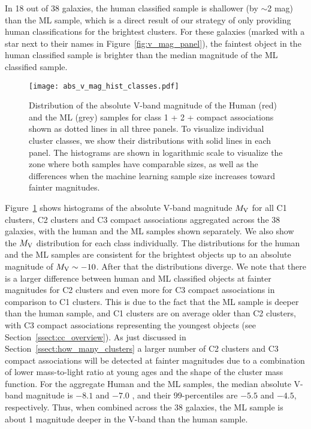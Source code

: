 \documentclass[linenumbers]{aastex63}
\begin{document}
In 18 out of 38 galaxies, the human classified sample is shallower (by $\sim$2 mag) than the ML sample, which is a direct result of our strategy of only providing human classifications for the brightest clusters. %
For these galaxies (marked with a star next to their names in Figure~\ref{fig:v_mag_panel}), the faintest object in the human classified sample is brighter than the median magnitude of the ML classified sample. 
%
\begin{figure} 
\texttt{[image: abs\_v\_mag\_hist\_classes.pdf]}
 \caption{Distribution of the absolute V-band magnitude of the Human (red) and the ML (grey) samples for class 1 + 2 + compact associations shown as dotted lines in all three panels. To visualize individual cluster classes, we show their distributions with solid lines in each panel. The histograms are shown in logarithmic scale to visualize the zone where both samples have comparable sizes, as well as the differences when the machine learning sample size increases toward fainter magnitudes. }%
 \label{fig:v_abs_mag}
\end{figure}
%

Figure~\ref{fig:v_abs_mag} shows histograms of the absolute V-band magnitude $M_{\rm V}$ for all C1 clusters, C2 clusters and C3 compact associations aggregated across the 38 galaxies, with the human and the ML samples shown separately. We also show the $M_{\rm V}$ distribution for each class individually. The distributions for the human and the ML samples are consistent for the brightest objects up to an absolute magnitude of $M_{\rm V} \sim -10$. After that the distributions diverge.
We note that there is a larger difference between human and ML classified objects at fainter magnitudes for C2 clusters and even more for C3 compact associations in comparison to C1 clusters. 
This is due to the fact that the ML sample is deeper than the human sample, and C1 clusters are on average older than C2 clusters, with C3 compact associations representing the youngest objects (see Section~\ref{ssect:cc_overview}). As just discussed in Section~\ref{ssect:how_many_clusters} a larger number of C2 clusters and C3 compact associations will be detected at fainter magnitudes due to a combination of lower mass-to-light ratio at young ages and the shape of the cluster mass function.
For the aggregate Human and the ML samples, the median absolute V-band magnitude is $-8.1$ and $-7.0$ , and their 99-percentiles are $-5.5$ and $-4.5$, respectively. Thus, when combined across the 38 galaxies, the ML sample is about 1 magnitude deeper in the V-band than the human sample.
\end{document}
